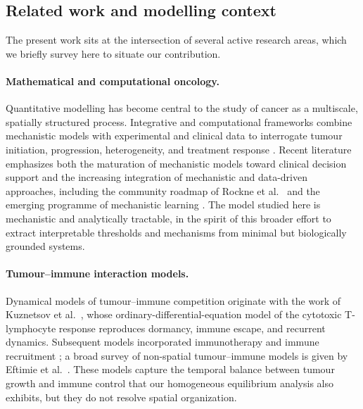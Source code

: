 \documentclass[a4paper,fleqn,longmktitle]{cas-sc}
\theoremstyle{plain}
\theoremstyle{definition}
\numberwithin{equation}{section}
\begin{document}
\subsection{Related work and modelling context}
\label{subsec:related-work}

The present work sits at the intersection of several active research areas, which
we briefly survey here to situate our contribution.

\paragraph{Mathematical and computational oncology.}
Quantitative modelling has become central to the study of cancer as a multiscale,
spatially structured process. Integrative and computational frameworks combine
mechanistic models with experimental and clinical data to interrogate tumour
initiation, progression, heterogeneity, and treatment response
\cite{anderson2008integrative,altrock2015mathematics,yu2026microscopic,mcdonald2023computational,gopukumar2026multiscale,yu2026size}. Recent literature emphasizes both the
maturation of mechanistic models toward clinical decision support and the
increasing integration of mechanistic and data-driven approaches, including the
community roadmap of Rockne et al.\ \cite{rockne20192019} and the emerging programme
of mechanistic learning \cite{metzcar2024review,lan2025shallow,cai2026optimal,de2025radiation,laslo2025mechanistic}. The model studied here is mechanistic
and analytically tractable, in the spirit of this broader effort to extract
interpretable thresholds and mechanisms from minimal but biologically grounded
systems.

\paragraph{Tumour--immune interaction models.}
Dynamical models of tumour--immune competition originate with the work of
Kuznetsov et al.\ \cite{kuznetsov1994nonlinear,gao2022rolling}, whose ordinary-differential-equation
model of the cytotoxic T-lymphocyte response reproduces dormancy, immune escape,
and recurrent dynamics. Subsequent models incorporated immunotherapy and immune
recruitment \cite{kirschner1998modeling,de2001mathematical,mehdizadeh2023targeting,yu2026beyond,barrera2025impact}; a broad survey of
non-spatial tumour--immune models is given by Eftimie et al.\ \cite{eftimie2011interactions}.
These models capture the temporal balance between tumour growth and immune
control that our homogeneous equilibrium analysis also exhibits, but they do not
resolve spatial organization.
\end{document}
